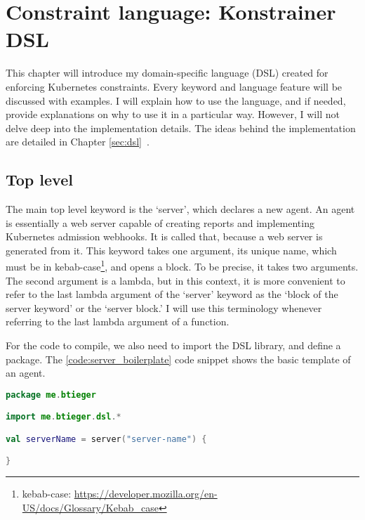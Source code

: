 \setlength{\parindent}{0pt}
\setlength{\parskip}{0.6em}

\chapter[Constraint language]{Constraint language: Konstrainer DSL}
\label{chap:konst_dsl}

This chapter will introduce my domain-specific language (DSL) created for enforcing Kubernetes constraints. Every keyword and language feature will be discussed with examples. I will explain how to use the language, and if needed, provide explanations on why to use it in a particular way. However, I will not delve deep into the implementation details. The ideas behind the implementation are detailed in Chapter \ref{sec:dsl}~.

\section{Top level}

The main top level keyword is the `server', which declares a new agent. An agent is essentially a web server capable of creating reports and implementing Kubernetes admission webhooks. It is called that, because a web server is generated from it. This keyword takes one argument, its unique name, which must be in kebab-case\footnote{kebab-case: \url{https://developer.mozilla.org/en-US/docs/Glossary/Kebab_case}}, and opens a block. To be precise, it takes two arguments. The second argument is a lambda, but in this context, it is more convenient to refer to the last lambda argument of the `server' keyword as the `block of the server keyword' or the `server block.' I will use this terminology whenever referring to the last lambda argument of a function.

For the code to compile, we also need to import the DSL library, and define a package. The \ref{code:server_boilerplate} code snippet shows the basic template of an agent.

\begin{lstlisting}[caption={Template of a DSL script},language=Kotlin,label=code:server_boilerplate]
package me.btieger

import me.btieger.dsl.*

val serverName = server("server-name") {

}
\end{lstlisting}

